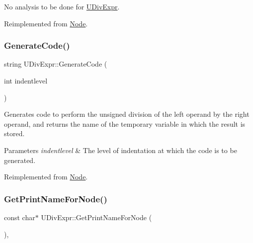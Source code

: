 No analysis to be done for \hyperlink{class_u_div_expr}{U\+Div\+Expr}. 

Reimplemented from \hyperlink{class_node_a5f88d55c6f253a29def7ccc443d83d47}{Node}.

\mbox{\label{class_u_div_expr_a9d76ec802dcedb0b5045ca8b293a0595}} 
\subsubsection{\texorpdfstring{Generate\+Code()}{GenerateCode()}}
{\footnotesize\ttfamily string U\+Div\+Expr\+::\+Generate\+Code (\begin{DoxyParamCaption}\item[{int}]{indentlevel }\end{DoxyParamCaption})\hspace{0.3cm}{\ttfamily [virtual]}}

Generates code to perform the unsigned division of the left operand by the right operand, and returns the name of the temporary variable in which the result is stored. 
\begin{DoxyParams}{Parameters}
{\em indentlevel} & The level of indentation at which the code is to be generated. \\
\hline
\end{DoxyParams}


Reimplemented from \hyperlink{class_node_acb60e526730e8436056375a3055c2c32}{Node}.

\mbox{\label{class_u_div_expr_aa7e3510bc0445544639489b6bc3a9a0c}} 
\subsubsection{\texorpdfstring{Get\+Print\+Name\+For\+Node()}{GetPrintNameForNode()}}
{\footnotesize\ttfamily const char$\ast$ U\+Div\+Expr\+::\+Get\+Print\+Name\+For\+Node (\begin{DoxyParamCaption}{ }\end{DoxyParamCaption})\hspace{0.3cm}{\ttfamily [inline]}, {\ttfamily [virtual]}}

